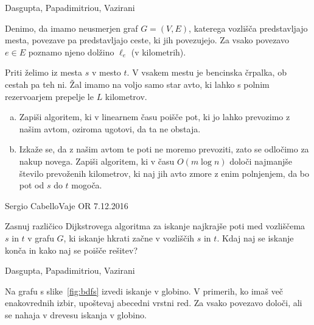 \begin{naloga}%
{Dasgupta, Papadimitriou, Vazirani}{\cite[Exercise~4.13]{dpv}}
\begin{vprasanje}
Denimo, da imamo neusmerjen graf $G = (V, E)$,
katerega vozlišča pred\-stav\-lja\-jo mesta,
povezave pa predstavljajo ceste, ki jih povezujejo.
Za vsako povezavo $e \in E$ poznamo njeno dolžino $\ell_e$ (v kilometrih).

Priti želimo iz mesta $s$ v mesto $t$.
V vsakem mestu je bencinska črpalka, ob cestah pa teh ni.
Žal imamo na voljo samo star avto,
ki lahko s polnim rezervoarjem prepelje le $L$ kilometrov.
\begin{enumerate}[(a)]
\item Zapiši algoritem, ki v linearnem času poišče pot,
ki jo lahko prevozimo z našim avtom,
oziroma ugotovi, da ta ne obstaja.
\item Izkaže se, da z našim avtom te poti ne moremo prevoziti,
zato se odločimo za nakup novega.
Zapiši algoritem, ki v času $O(m \log n)$
določi najmanjše število prevoženih kilometrov,
ki naj jih avto zmore z enim polnjenjem,
da bo pot od $s$ do $t$ mogoča.
\end{enumerate}

\end{vprasanje}
\begin{odgovor}
\end{odgovor}
\end{naloga}


\begin{naloga}{Sergio Cabello}{Vaje OR 7.12.2016}
\begin{vprasanje}
Zasnuj različico Dijkstrovega algoritma
za iskanje najkrajše poti med vozliščema $s$ in $t$ v grafu $G$,
ki iskanje hkrati začne v vozliščih $s$ in $t$.
Kdaj naj se iskanje konča in kako naj se poišče rešitev?
\end{vprasanje}
\begin{odgovor}
\end{odgovor}
\end{naloga}


\begin{naloga}%
{Dasgupta, Papadimitriou, Vazirani}{\cite[Exercise~3.1]{dpv}}
\begin{vprasanje}
Na grafu s slike~\ref{fig:bdfs} izvedi iskanje v globino.
V primerih, ko imaš več ena\-ko\-vred\-nih izbir,
upoštevaj abecedni vrstni red.
Za vsako povezavo določi, ali se nahaja v drevesu iskanja v globino.
\end{vprasanje}
\begin{odgovor}
\end{odgovor}
\end{naloga}


